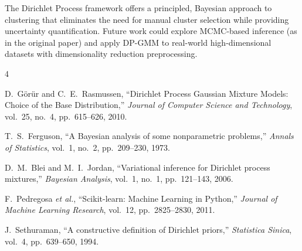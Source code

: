 \documentclass[conference]{IEEEtran}
\begin{document}
The Dirichlet Process framework offers a principled, Bayesian approach to clustering that eliminates the need for manual cluster selection while providing uncertainty quantification. Future work could explore MCMC-based inference (as in the original paper) and apply DP-GMM to real-world high-dimensional datasets with dimensionality reduction preprocessing.

\begin{thebibliography}{4}

D.~G\"{o}r\"{u}r and C.~E.~Rasmussen, ``Dirichlet Process Gaussian Mixture Models: Choice of the Base Distribution,'' \textit{Journal of Computer Science and Technology}, vol.~25, no.~4, pp.~615--626, 2010.

T.~S.~Ferguson, ``A Bayesian analysis of some nonparametric problems,'' \textit{Annals of Statistics}, vol.~1, no.~2, pp.~209--230, 1973.

D.~M.~Blei and M.~I.~Jordan, ``Variational inference for Dirichlet process mixtures,'' \textit{Bayesian Analysis}, vol.~1, no.~1, pp.~121--143, 2006.

F.~Pedregosa \textit{et al.}, ``Scikit-learn: Machine Learning in Python,'' \textit{Journal of Machine Learning Research}, vol.~12, pp.~2825--2830, 2011.

J.~Sethuraman, ``A constructive definition of Dirichlet priors,'' \textit{Statistica Sinica}, vol.~4, pp.~639--650, 1994.

\end{thebibliography}
\end{document}
